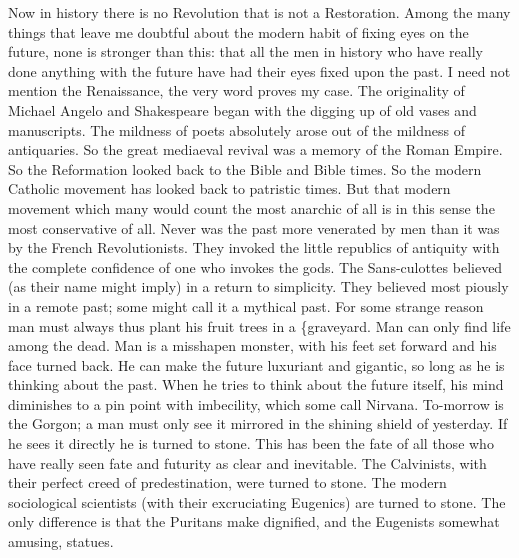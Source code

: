 \documentclass{book}
\begin{document}
Now in history there is no Revolution that is not a Restoration. Among the many things that leave me doubtful about the modern habit of fixing eyes on the future, none is stronger than this: that all the men in history who have really done anything with the future have had their eyes fixed upon the past. I need not mention the Renaissance, the very word proves my case. The originality of Michael Angelo and Shakespeare began with the digging up of old vases and manuscripts. The mildness of poets absolutely arose out of the mildness of antiquaries. So the great mediaeval revival was a memory of the Roman Empire. So the Reformation looked back to the Bible and Bible times. So the modern Catholic movement has looked back to patristic times. But that modern movement which many would count the most anarchic of all is in this sense the most conservative of all. Never was the past more venerated by men than it was by the French Revolutionists. They invoked the little republics of antiquity with the complete confidence of one who invokes the gods. The Sans-culottes believed (as their name might imply) in a return to simplicity. They believed most piously in a remote past; some might call it a mythical past. For some strange reason man must always thus plant his fruit trees in a \{graveyard. Man can only find life among the dead. Man is a misshapen monster, with his feet set forward and his face turned back. He can make the future luxuriant and gigantic, so long as he is thinking about the past. When he tries to think about the future itself, his mind diminishes to a pin point with imbecility, which some call Nirvana. To-morrow is the Gorgon; a man must only see it mirrored in the shining shield of yesterday. If he sees it directly he is turned to stone. This has been the fate of all those who have really seen fate and futurity as clear and inevitable. The Calvinists, with their perfect creed of predestination, were turned to stone. The modern sociological scientists (with their excruciating Eugenics) are turned to stone. The only difference is that the Puritans make dignified, and the Eugenists somewhat amusing, statues.
\end{document}
